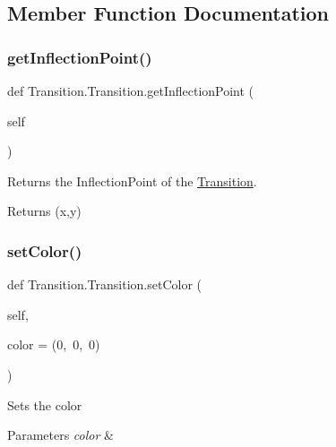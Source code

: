 \subsection{Member Function Documentation}
\mbox{\label{classTransition_1_1Transition_a694845bc683f2e6143b8b8678ee2d5ce}} 
\subsubsection{\texorpdfstring{getInflectionPoint()}{getInflectionPoint()}}
{\footnotesize\ttfamily def Transition.\+Transition.\+get\+Inflection\+Point (\begin{DoxyParamCaption}\item[{}]{self }\end{DoxyParamCaption})}



Returns the Inflection\+Point of the \mbox{\hyperlink{classTransition_1_1Transition}{Transition}}. 

\begin{DoxyVerb}Returns (x,y)\end{DoxyVerb}
 \mbox{\label{classTransition_1_1Transition_a1e3d1da8e24b80ef43afa364c559fed8}} 
\subsubsection{\texorpdfstring{setColor()}{setColor()}}
{\footnotesize\ttfamily def Transition.\+Transition.\+set\+Color (\begin{DoxyParamCaption}\item[{}]{self,  }\item[{}]{color = {\ttfamily (0,~0,~0)} }\end{DoxyParamCaption})}



Sets the color   


\begin{DoxyParams}{Parameters}
{\em color} & \\
\hline
\end{DoxyParams}
\mbox{\label{classTransition_1_1Transition_af6c4e34a89833cb3c700bc918aaafde1}} 
